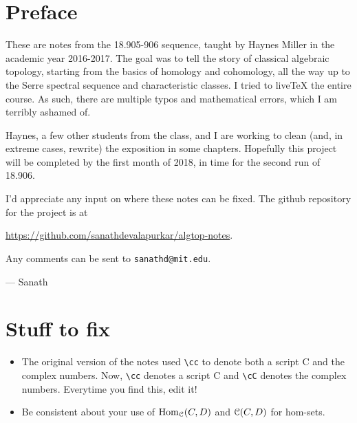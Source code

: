 \cleardoublepage
\section*{Preface}
These are notes from the 18.905-906 sequence, taught by Haynes Miller in the
academic year 2016-2017. The goal was to tell the story of classical algebraic
topology, starting from the basics of homology and cohomology, all the way up
to the Serre spectral sequence and characteristic classes. I tried to live\TeX
the entire course. As such, there are multiple typos and mathematical errors,
which I am terribly ashamed of.

Haynes, a few other students from the class, and I are working to clean (and,
in extreme cases, rewrite) the exposition in some chapters. Hopefully this
project will be completed by the first month of 2018, in time for the second
run of 18.906.

I'd appreciate any input on where these notes can be fixed. The github
repository for the project is at
\begin{center}
    \url{https://github.com/sanathdevalapurkar/algtop-notes}.
\end{center}
Any comments can be sent to \verb|sanathd@mit.edu|.

--- Sanath

\newpage

\section*{Stuff to fix}
\begin{itemize}
    \item The original version of the notes used
	\verb|\cc| to denote both a script C and the complex numbers.
	Now, \verb|\cc| denotes a script C and \verb|\cC| denotes the complex numbers.
	Everytime you find this, edit it!
    \item Be consistent about your use of $\operatorname{Hom}_\mathcal C(C,D)$ and $\mathcal C(C,D)$ for hom-sets.
\end{itemize}
